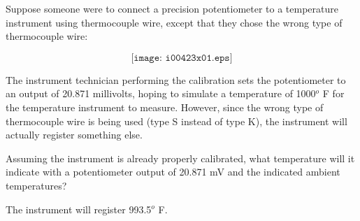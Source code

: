 

Suppose someone were to connect a precision potentiometer to a temperature instrument using thermocouple wire, except that they chose the wrong type of thermocouple wire:

$$\texttt{[image: i00423x01.eps]}$$

The instrument technician performing the calibration sets the potentiometer to an output of 20.871 millivolts, hoping to simulate a temperature of 1000$^{o}$ F for the temperature instrument to measure.  However, since the wrong type of thermocouple wire is being used (type S instead of type K), the instrument will actually register something else.

Assuming the instrument is already properly calibrated, what temperature will it indicate with a potentiometer output of 20.871 mV and the indicated ambient temperatures?







The instrument will register 993.5$^{o}$ F.











